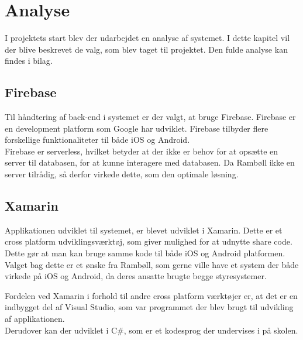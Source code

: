 \chapter{Analyse}
I projektets start blev der udarbejdet en analyse af systemet. I dette kapitel vil der blive beskrevet de valg, som blev taget til projektet. Den fulde analyse kan findes i bilag. \\

\section{Firebase}
	Til håndtering af back-end i systemet er der valgt, at bruge Firebase. Firebase\cite{Firebase} er en development platform som Google har udviklet. Firebase tilbyder flere forskellige funktionaliteter til både iOS og Android. \\
	Firebase er serverless, hvilket betyder at der ikke er behov for at opsætte en server til databasen, for at kunne interagere med databasen. Da Rambøll ikke en server tilrådig, så derfor virkede dette, som den optimale løsning. \\

\section{Xamarin}
	Applikationen udviklet til systemet, er blevet udviklet i Xamarin\cite{Xarmain}. Dette er et cross platform udviklingsværktøj, som giver mulighed for at udnytte share code. Dette gør at man kan bruge samme kode til både iOS og Android platformen. \\
	Valget bag dette er et ønske fra Rambøll, som gerne ville have et system der både virkede på iOS og Android, da deres ansatte brugte begge styresystemer.
	
	Fordelen ved Xamarin i forhold til andre cross platform værktøjer er, at det er en indbygget del af Visual Studio, som var programmet der blev brugt til udvikling af applikationen. \\
	Derudover kan der udviklet i C\#, som er et kodesprog der undervises i på skolen.